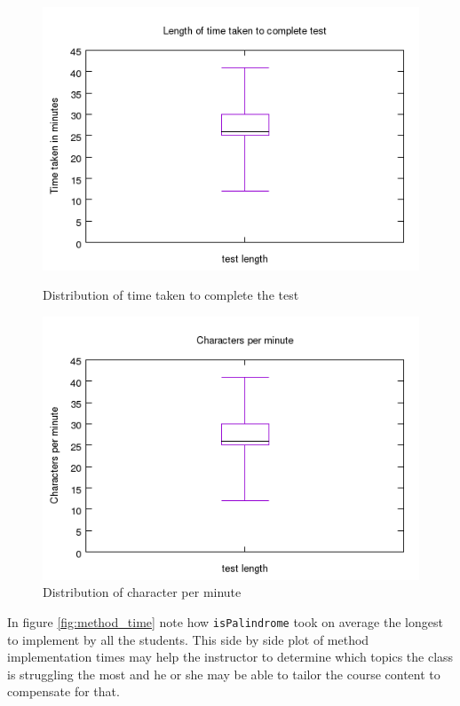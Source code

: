 \documentclass[twocolumn]{article}
\begin{document}
\begin{figure}[h!bt]
\centering
\includegraphics[width=\linewidth]{figures/test_length}
\caption{Distribution of time taken to complete the test}
\label{fig:test_len}
\includegraphics[width=\linewidth]{figures/char_per_minute}
\caption{Distribution of character per minute}
\label{fig:chars}
\end{figure}

In figure \ref{fig:method_time} note how \texttt{isPalindrome} took on average
the longest to implement by all the students. This side by side plot of method
implementation times may help the instructor to determine which topics the
class is struggling the most and he or she may be able to tailor the course
content to compensate for that.
\end{document}
